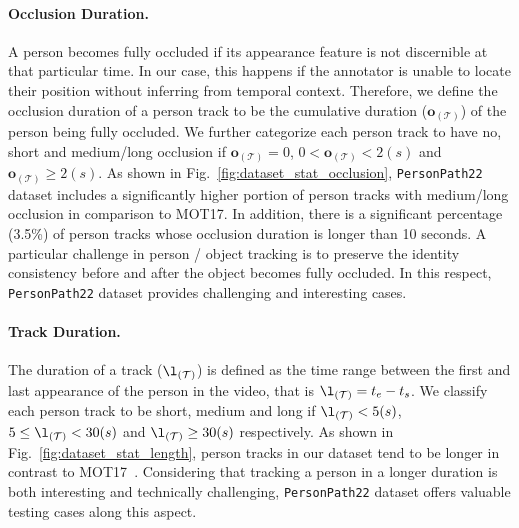\documentclass[runningheads]{llncs}
\begin{document}
\paragraph{\textbf{Occlusion Duration.}}
A person becomes fully occluded if its appearance feature is not discernible at that particular time. In our case,  this happens if the annotator is unable to locate their position without inferring from temporal context. Therefore, we define the occlusion duration of a person track to be the cumulative duration ($\mathbf{o}_{(\mathcal{T})}$) of the person being fully occluded. We further categorize each person track to have no, short and medium/long occlusion if $\mathbf{o}_{(\mathcal{T})} = 0$, $0 < \mathbf{o}_{(\mathcal{T})} < 2(s)$ and $\mathbf{o}_{(\mathcal{T})} \geq 2(s)$. As shown in Fig.~\ref{fig:dataset_stat_occlusion}, \texttt{PersonPath22} dataset includes a significantly higher portion of person tracks with medium/long occlusion in comparison to MOT17. In addition, there is a significant percentage (3.5\%) of person tracks whose occlusion duration is longer than 10 seconds. A particular challenge in person / object tracking is to preserve the identity consistency before and after the object becomes fully occluded. In this respect, \texttt{PersonPath22} dataset provides challenging and interesting cases. 




\paragraph{\textbf{Track Duration.}} The duration of a track ($\mathbf{\l}_{(\mathcal{T})}$) is defined as the time range between the first and last appearance of the person in the video, that is  $\mathbf{\l}_{(\mathcal{T})} = t_e - t_s$. We classify each person track to be short, medium and long if $\mathbf{\l}_{(\mathcal{T})} < 5(s)$, $5 \leq \mathbf{\l}_{(\mathcal{T})} < 30(s)$ and $\mathbf{\l}_{(\mathcal{T})} \geq 30(s)$ respectively. As shown in Fig.~\ref{fig:dataset_stat_length}, person tracks in our dataset tend to be longer in contrast to MOT17~\cite{mot}. Considering that tracking a person in a longer duration is both interesting and technically challenging, \texttt{PersonPath22} dataset offers valuable testing cases along this aspect.
\end{document}
